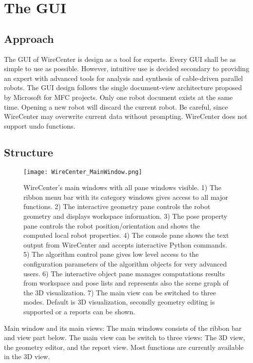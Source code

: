 \documentclass[11pt,a4paper,onepage,openany]{book}
\begin{document}
\section{The GUI}

\subsection{Approach} The GUI of WireCenter is design as a tool for experts.
Every GUI shall be as simple to use as possible. However, intuitive use is
decided secondary to providing an expert with advanced tools for analysis and
synthesis of cable-driven parallel robots. The GUI design follows the single
document-view architecture proposed by Microsoft for MFC projects. Only one
robot document exists at the same time. Opening a new robot will discard the
current robot. Be careful, since WireCenter may overwrite current data without
prompting. WireCenter does not support undo functions.

\subsection{Structure}
\begin{figure}[tp]
  \centering
  \texttt{[image: WireCenter\_MainWindow.png]}
  \caption{WireCenter's main windows with all pane windows visible. 1) The ribbon
  menu bar with its category windows gives access to all major functions. 2) The
  interactive geometry pane controls the robot geometry and displays workspace
  information. 3) The pose property pane controls the robot position/orientation
  and shows the computed local robot properties. 4) The console pane shows the
  text output from WireCenter and accepts interactive Python commands. 5) The
  algorithm control pane gives low level access to the configuration parameters
  of the algorithm objects for very advanced users. 6) The interactive object pane
  manages computations results from workspace and pose lists and represents also
  the scene graph of the 3D visualization. 7) The main view can be switched to three
  modes. Default is 3D visualization, secondly geometry editing is supported or
  a reports can be shown.}
  \label{fig:WireCenterMainWindow}
\end{figure}

Main window and its main views: The main windows consists of the ribbon bar and
view part below. The main view can be switch to three views: The 3D view, the
geometry editor, and the report view. Most functions are currently available in
the 3D view.
\end{document}
